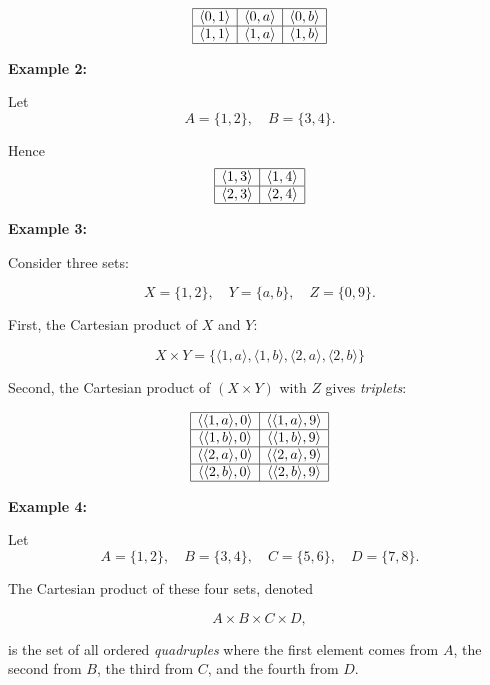 \documentclass[12pt,a4paper,openany]{article}
\begin{document}
$$
\begin{array}{|c|c|c|}
\hline
\langle 0,1 \rangle & \langle 0,a \rangle & \langle 0,b \rangle \\ \hline
\langle 1,1 \rangle & \langle 1,a \rangle & \langle 1,b \rangle \\ \hline
\end{array}
$$

\textbf{Example 2:}

Let  
$$
A = \{1, 2\}, \quad B = \{3, 4\}.
$$  

Hence
$$
\begin{array}{|c|c|}
\hline
\langle 1,3 \rangle & \langle 1,4 \rangle \\ \hline
\langle 2,3 \rangle & \langle 2,4 \rangle \\ \hline
\end{array}
$$


\textbf{Example 3:} 

Consider three sets:

$$
X = \{1, 2\}, \quad 
Y = \{a, b\}, \quad
Z = \{0, 9\}.
$$  

First, the Cartesian product of $X$ and $Y$:

$$
X \times Y = \{\langle 1,a \rangle, \langle 1,b \rangle, \langle 2,a \rangle, \langle 2,b \rangle\}
$$


Second, the Cartesian product of $(X \times Y)$ with $Z$ gives \textit{triplets}:

$$
\begin{array}{|c|c|}
\hline
\langle \langle 1,a \rangle, 0 \rangle & \langle \langle 1,a \rangle, 9 \rangle \\ \hline
\langle \langle 1,b \rangle, 0 \rangle & \langle \langle 1,b \rangle, 9 \rangle \\ \hline
\langle \langle 2,a \rangle, 0 \rangle & \langle \langle 2,a \rangle, 9 \rangle \\ \hline
\langle \langle 2,b \rangle, 0 \rangle & \langle \langle 2,b \rangle, 9 \rangle \\ \hline
\end{array}
$$


\textbf{Example 4:}

Let  
$$
A = \{1, 2\}, \quad B = \{3, 4\}, \quad C = \{5, 6\}, \quad D = \{7, 8\}.
$$  

The Cartesian product of these four sets, denoted  

$$
A \times B \times C \times D,
$$  

is the set of all ordered \textit{quadruples} where the first element comes from $A$, the second from $B$, the third from $C$, and the fourth from $D$.  
\end{document}
